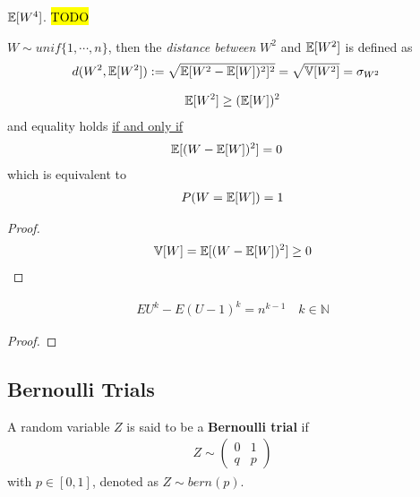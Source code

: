 \documentclass{article}
\begin{document}
   	\begin{proposition}
   		$\mathbb{E}[{W^4}]$. \hl{TODO}
   	\end{proposition}
   	
   	\begin{definition}
   		$W \sim unif\{1, \cdots, n\}$, then the \emph{distance between} $W^2$ and $\mathbb{E}[{W^2}]$ is defined as
   		\begin{align}
   			d(W^2, \mathbb{E}[{W^2}]) &:= \sqrt{\mathbb{E}[{W^2 - \mathbb{E}[{W}])^2}]^2} = \sqrt{\mathbb{V}[{W^2}]} = \sigma_{W^2}
   		\end{align}
   	\end{definition}
   	
   	\begin{corollary}
   		\begin{align}
   			\mathbb{E}[{W^2}] \geq (\mathbb{E}[{W}])^2
   		\end{align}
   		and equality holds \ul{if and only if}
   		\begin{align}
   			\mathbb{E}[{(W - \mathbb{E}[{W}])^2}] &= 0
   		\end{align}
   		which is equivalent to
   		\begin{align}
   			P(W = \mathbb{E}[{W}]) = 1
   		\end{align}
   	\end{corollary}
   	\begin{proof}
   		\begin{align}
	   		\mathbb{V}[{W}] = \mathbb{E}[{(W - \mathbb{E}[{W}])^2}] \geq 0
   		\end{align}
   	\end{proof}
   	
   	\begin{theorem}
   		\begin{align}
   			E U^{k}-E(U-1)^{k}=n^{k-1} \quad k \in \mathbb{N}
   		\end{align}
   	\end{theorem}
   	
   	\begin{proof}
   	\end{proof}
   	
   	
   	\subsection{Bernoulli Trials}
   	\begin{definition}
   		A random variable $Z$ is said to be a \textbf{Bernoulli trial} if 
   		\begin{align}
   			Z \sim\left(\begin{array}{ll}{0} & {1} \\ {q} & {p}\end{array}\right)
   		\end{align}
   		with $p \in [0, 1]$, denoted as $Z \sim bern(p)$.
   	\end{definition}
   	
\end{document}
